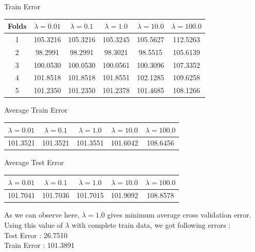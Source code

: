 \documentclass[twoside,10pt,a4paper]{article}
\theoremstyle{definition}
\theoremstyle{definition}
\theoremstyle{remark}
\renewcommand{\>}{{\rightarrow}}
\newcommand{\1}{{\mathbf 1}}
\newcommand{\0}{{\mathbf 0}}
\begin{document}
\vspace{100pt}
Train Error \\
\begin{center}
\begin{tabular}{|c| c| c | c | c | c|}
\hline
  Folds & $\lambda = 0.01$ & $\lambda = 0.1$ & $\lambda = 1.0 $ & $\lambda = 10.0$& $\lambda = 100.0$\\
\hline

1 &  105.3216 & 105.3216 & 105.3245 & 105.5627 & 112.5263 \\
2 &  98.2991  & 98.2991  & 98.3021 &  98.5515 & 105.6139 \\
3 & 100.0530 & 100.0530 & 100.0561 & 100.3096 & 107.3352 \\
4 & 101.8518 & 101.8518 & 101.8551 & 102.1285 & 109.6258 \\
5 & 101.2350 & 101.2350 & 101.2378 & 101.4685 & 108.1266 \\
\hline
\end{tabular}
\end{center}

Average Train Error

\begin{center}
\begin{tabular}{| c| c | c | c | c|}
\hline
   $\lambda = 0.01$ & $\lambda = 0.1$ & $\lambda = 1.0 $ & $\lambda = 10.0$& $\lambda = 100.0$\\
\hline
 101.3521 & 101.3521 & 101.3551 & 101.6042 & 108.6456 \\
\hline
\end{tabular}
\end{center}

Average Test Error
\begin{center}
\begin{tabular}{| c| c | c | c | c|}
\hline
   $\lambda = 0.01$ & $\lambda = 0.1$ & $\lambda = 1.0 $ & $\lambda = 10.0$& $\lambda = 100.0$\\
\hline
  101.7041 & 101.7036 & 101.7015 & 101.9092 & 108.8578 \\
\hline
\end{tabular}
\end{center}
As we can observe here, $\lambda = 1.0 $ gives minimum average cross validation error. \\
Using this value of $\lambda$ with complete train data, we got following errors : \\
Test Error :    26.7510 \\
Train Error :   101.3891 \\
\end{document}
